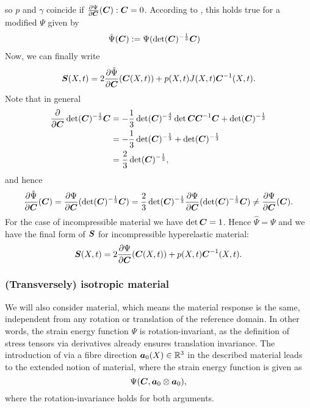 so $p$ and $\gamma$ coincide if $\frac{\partial \Psi}{\partial \boldsymbol{C}}(\boldsymbol{C}):\boldsymbol{C} = 0$.
According to \cite[p. 168]{Bonet2008}, this holds true for a modified $\Psi$ given by
\begin{align}
	\hat{\Psi}(\boldsymbol{C}) &:= \Psi(\det(\boldsymbol{C})^{-\frac{1}{3}}\boldsymbol{C})
\end{align}
Now, we can finally write
\begin{align}
	\boldsymbol{S}(X,t) = 2\frac{\partial \hat\Psi}{\partial \boldsymbol{C}}(\boldsymbol{C}(X,t)) + p(X,t)J(X,t)\boldsymbol{C}^{-1}(X,t).\label{def:secondpiola_pressure}
\end{align}
Note that in general
\begin{align*}
	\frac{\partial }{\partial \boldsymbol{C}}\det(\boldsymbol{C})^{-\frac{1}{3}}\boldsymbol{C} &= -\frac{1}{3}\det(\boldsymbol{C})^{-\frac{4}{3}}\det\boldsymbol{C} \boldsymbol{C}^{-1} \boldsymbol{C} + \det(\boldsymbol{C})^{-\frac{1}{3}}\\
		&=-\frac{1}{3}\det(\boldsymbol{C})^{-\frac{1}{3}} + \det(\boldsymbol{C})^{-\frac{1}{3}}\\
		&=\frac{2}{3}\det(\boldsymbol{C})^{-\frac{1}{3}},
\end{align*}
and hence
\begin{align}
	\frac{\partial \hat\Psi}{\partial \boldsymbol{C}}(\boldsymbol{C}) = \frac{\partial \Psi}{\partial \boldsymbol{C}}(\det(\boldsymbol{C})^{-\frac{1}{3}}\boldsymbol{C})
	= \frac{2}{3}\det(\boldsymbol{C})^{-\frac{1}{3}}\frac{\partial \Psi}{\partial \boldsymbol{C}}(\det(\boldsymbol{C})^{-\frac{1}{3}}\boldsymbol{C}) \neq \frac{\partial \Psi}{\partial \boldsymbol{C}}(\boldsymbol{C}).  
\end{align}
For the case of incompressible material we have $\det\boldsymbol{C} = 1$.
Hence $\hat{\Psi} = \Psi$ and we have the final form of $\boldsymbol{S}$ for incompressible hyperelastic material:
\begin{align}
	\boldsymbol{S}(X,t) = 2\frac{\partial \Psi}{\partial \boldsymbol{C}}(\boldsymbol{C}(X,t)) + p(X,t)\boldsymbol{C}^{-1}(X,t).\label{def:incompressible_secondpiola_pressure}
\end{align}

\subsubsection{(Transversely) isotropic material}
We will also consider  material, which means the material response is the same, independent from any rotation or translation of
the reference domain.
In other words, the strain energy function $\Psi$ is rotation-invariant, as the definition of stress tensors via derivatives already ensures translation invariance. 
The introduction of  via a fibre direction $\boldsymbol{a}_0(X)\in\mathbb{R}^3$
in the described material leads to the extended notion of  material, where
the strain energy function is given as
\[
	\Psi(\boldsymbol{C},\boldsymbol{a}_0\otimes \boldsymbol{a}_0),
\]
where the rotation-invariance holds for both arguments.

